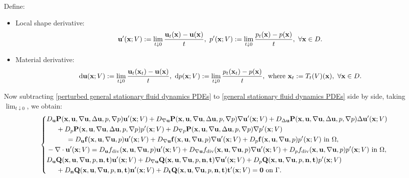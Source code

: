 \documentclass[oneside]{book}
\numberwithin{equation}{section}
\begin{document}
Define:
\begin{itemize}
    \item Local shape derivative:
    \begin{align*}
        {\bf u}'({\bf x};V) := \lim_{t\downarrow 0} \frac{{\bf u}_t({\bf x}) - {\bf u}({\bf x})}{t},\ p'({\bf x};V) := \lim_{t\downarrow 0} \frac{p_t({\bf x}) - p({\bf x})}{t},\ \forall{\bf x}\in D.
    \end{align*}
    \item Material derivative:
    \begin{align*}
        {\rm d}{\bf u}({\bf x};V) := \lim_{t\downarrow 0} \frac{{\bf u}_t({\bf x}_t) - {\bf u}({\bf x})}{t},\ {\rm d}p({\bf x};V) := \lim_{t\downarrow 0} \frac{p_t({\bf x}_t) - p({\bf x})}{t}, \mbox{ where } {\bf x}_t := T_t(V)({\bf x}),\ \forall{\bf x}\in D.
    \end{align*}
\end{itemize}
Now subtracting \eqref{perturbed general stationary fluid dynamics PDEs} to \eqref{general stationary fluid dynamics PDEs} side by side, taking $\lim_{t\downarrow 0}$, we obtain:
\begin{equation}
    \label{PDEs local shape derivative for general stationary fluid dynamics PDEs}
    \left\{\begin{split}
        &D_{\bf u}{\bf P}({\bf x},{\bf u},\nabla{\bf u},\Delta{\bf u},p,\nabla p){\bf u}'({\bf x};V) + D_{\nabla{\bf u}}{\bf P}({\bf x},{\bf u},\nabla{\bf u},\Delta{\bf u},p,\nabla p)\nabla{\bf u}'({\bf x};V) + D_{\Delta{\bf u}}{\bf P}({\bf x},{\bf u},\nabla{\bf u},\Delta{\bf u},p,\nabla p)\Delta{\bf u}'({\bf x};V)\\
        &\hspace{5mm}+ D_p{\bf P}({\bf x},{\bf u},\nabla{\bf u},\Delta{\bf u},p,\nabla p)p'({\bf x};V) + D_{\nabla p}{\bf P}({\bf x},{\bf u},\nabla{\bf u},\Delta{\bf u},p,\nabla p)\nabla p'({\bf x};V)\\
        &\hspace{1cm}= D_{\bf u}{\bf f}({\bf x},{\bf u},\nabla{\bf u},p){\bf u}'({\bf x};V) + D_{\nabla{\bf u}}{\bf f}({\bf x},{\bf u},\nabla{\bf u},p)\nabla{\bf u}'({\bf x};V) + D_p{\bf f}({\bf x},{\bf u},\nabla{\bf u},p)p'({\bf x};V) \mbox{ in } \Omega,\\
        &-\nabla\cdot{\bf u}'({\bf x};V) = D_{\bf u}f_{\rm div}({\bf x},{\bf u},\nabla{\bf u},p){\bf u}'({\bf x};V) + D_{\nabla{\bf u}}f_{\rm div}({\bf x},{\bf u},\nabla{\bf u},p)\nabla{\bf u}'({\bf x};V) + D_pf_{\rm div}({\bf x},{\bf u},\nabla{\bf u},p)p'({\bf x};V) \mbox{ in } \Omega,\\
        &D_{\bf u}{\bf Q}({\bf x},{\bf u},\nabla{\bf u},p,{\bf n},{\bf t}){\bf u}'({\bf x};V) + D_{\nabla{\bf u}}{\bf Q}({\bf x},{\bf u},\nabla{\bf u},p,{\bf n},{\bf t})\nabla{\bf u}'({\bf x};V) + D_p{\bf Q}({\bf x},{\bf u},\nabla{\bf u},p,{\bf n},{\bf t})p'({\bf x};V)\\
        &\hspace{5mm}+ D_{\bf n}{\bf Q}({\bf x},{\bf u},\nabla{\bf u},p,{\bf n},{\bf t}){\bf n}'({\bf x};V) + D_{\bf t}{\bf Q}({\bf x},{\bf u},\nabla{\bf u},p,{\bf n},{\bf t}){\bf t}'({\bf x};V) = {\bf 0} \mbox{ on } \Gamma.
    \end{split}\right.
\end{equation}
\end{document}
